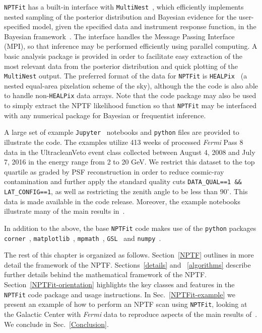  \texttt{NPTFit} has a built-in interface with \texttt{MultiNest}~\cite{Feroz:2008xx,Buchner:2014nha}, which efficiently implements nested sampling of the posterior distribution and Bayesian evidence for the user-specified model, given the specified data and instrument response function, in the Bayesian framework~\cite{Feroz:2013hea,Feroz:2007kg,skilling2006}.  The interface handles the Message Passing Interface (MPI), so that inference may be performed efficiently using parallel computing.  A basic analysis package is provided in order to facilitate easy extraction of the most relevant data from the posterior distribution and quick plotting of the \texttt{MultiNest} output.  The preferred format of the data for \texttt{NPTFit} is \texttt{HEALPix}~\cite{Gorski:2004by} (a nested equal-area pixelation scheme of the sky), although the the code is also able to handle non-\texttt{HEALPix} data arrays. Note that the code package may also be used to simply extract the NPTF likelihood function so that \texttt{NPTFit} may be interfaced with any numerical package for Bayesian or frequentist inference.

A large set of example \texttt{Jupyter}~\cite{PER-GRA:2007} notebooks and \texttt{python} files are provided to illustrate the code.  The examples utilize 413 weeks of processed \emph{Fermi} Pass 8 data in the UltracleanVeto event class collected between August 4, 2008 and July 7, 2016 in the energy range from 2 to 20 GeV. We restrict this dataset to the top quartile as graded by PSF reconstruction in order to reduce cosmic-ray contamination and further apply the standard quality cuts \texttt{DATA\_QUAL==1 \&\& LAT\_CONFIG==1}, as well as restricting the zenith angle to be less than $90^\circ$. This data is made available in the code release.  Moreover, the example notebooks illustrate many of the main results in~\cite{Lee:2015fea,Linden:2016rcf,Lisanti:2016jub}.

In addition to the above, the base \texttt{NPTFit} code makes use of the \texttt{python} packages \texttt{corner}~\cite{dan_foreman_mackey_2016_53155}, \texttt{matplotlib}~\cite{Hunter:2007}, \texttt{mpmath}~\cite{mpmath}, \texttt{GSL}~\cite{galassi2015gnu} and  \texttt{numpy}~\cite{oliphant2006guide}.

The rest of this chapter is organized as follows.  Section~\ref{NPTF} outlines in more detail the framework of the NPTF. Sections~\ref{details} and ~\ref{algorithms} describe further details behind the mathematical framework of the NPTF. Section~\ref{NPTFit-orientation} highlights the key classes and features in the \texttt{NPTFit} code package and usage instructions.  In Sec.~\ref{NPTFit-example} we present an example of how to perform an NPTF scan using \texttt{NPTFit}, looking at the Galactic Center with \emph{Fermi} data to reproduce aspects of the main results of~\cite{Lee:2015fea}. We conclude in Sec.~\ref{Conclusion}. 

